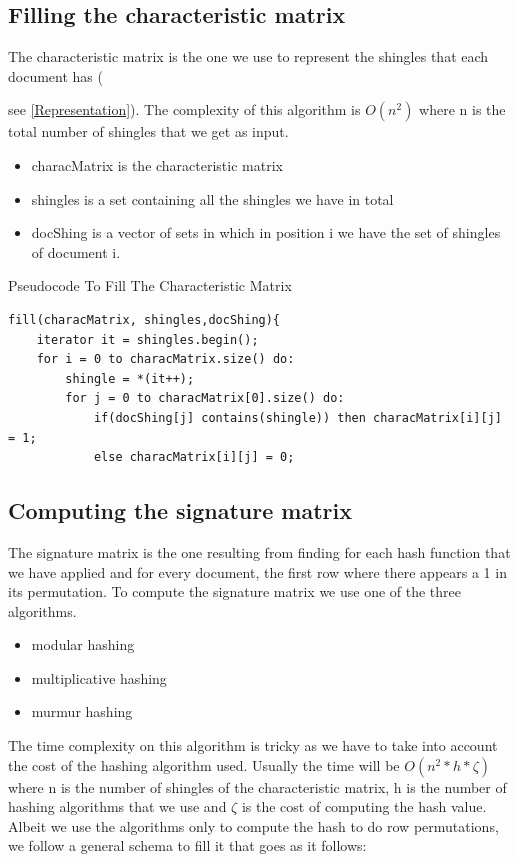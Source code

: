 \documentclass[12pt]{article}
\begin{document}
\subsection{Filling the characteristic matrix}
The characteristic matrix is the one we use to represent the shingles that each document has ({see \autoref{Representation}). The complexity of this algorithm is $O(n^2)$ where n is the total number of shingles that we get as input.
\begin{itemize}
\item characMatrix is the characteristic matrix
\item shingles is a set containing all the shingles we have in total
\item docShing is a vector of sets in which in position i we have the set of shingles of document i. 
\end{itemize}
 \begin{center}
\begin{large}
Pseudocode To Fill The Characteristic Matrix
\end{large}
\end{center}
 \begin{lstlisting}
fill(characMatrix, shingles,docShing){
    iterator it = shingles.begin();
    for i = 0 to characMatrix.size() do:
        shingle = *(it++);
        for j = 0 to characMatrix[0].size() do:
            if(docShing[j] contains(shingle)) then characMatrix[i][j] = 1;
            else characMatrix[i][j] = 0;
\end{lstlisting}
\medskip

\subsection{Computing the signature matrix}
The signature matrix is the one resulting from finding for each hash function that we have applied and for every document, the first row where there appears a 1 in its permutation.
To compute the signature matrix we use one of the three algorithms.
\begin{itemize}
\item modular hashing
\item multiplicative hashing
\item murmur hashing 
\end{itemize}
The time complexity on this algorithm is tricky as we have to take into account the cost of the hashing algorithm used. Usually the time will be $O(n^2 * h * \zeta)$ where n is the number of shingles of the characteristic matrix, h is the number of hashing algorithms that we use and $\zeta$ is the cost of computing the hash value.
Albeit we use the algorithms only to compute the hash to do row permutations, we follow a general schema to fill it that goes as it follows:

}
\end{document}
